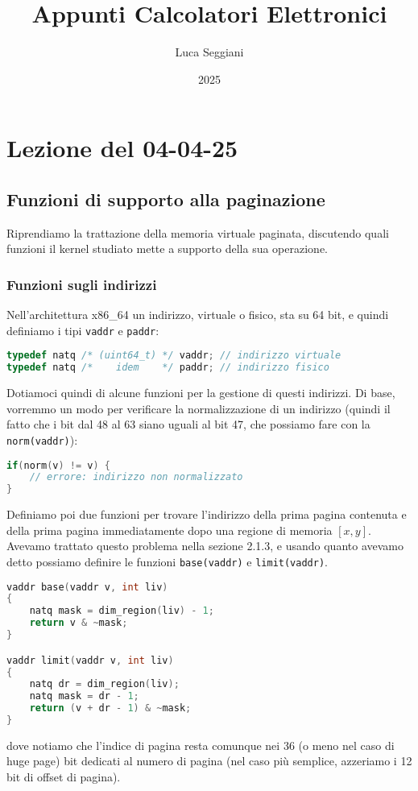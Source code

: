 \documentclass[a4paper,11pt]{article}
\title{Appunti Calcolatori Elettronici}
\author{Luca Seggiani}
\date{2025}
\begin{document}
\section{Lezione del 04-04-25}

\thispagestyle{empty}
\pagestyle{fancy}

\subsection{Funzioni di supporto alla paginazione}
Riprendiamo la trattazione della memoria virtuale paginata, discutendo quali funzioni il kernel studiato mette a supporto della sua operazione.

\subsubsection{Funzioni sugli indirizzi}
Nell'architettura x86\_64 un indirizzo, virtuale o fisico, sta su 64 bit, e quindi definiamo i tipi \lstinline|vaddr| e \lstinline|paddr|:
\begin{lstlisting}[language=C++, style=codestyle]	
typedef natq /* (uint64_t) */ vaddr; // indirizzo virtuale
typedef natq /*    idem    */ paddr; // indirizzo fisico 
\end{lstlisting}

Dotiamoci quindi di alcune funzioni per la gestione di questi indirizzi.
Di base, vorremmo un modo per verificare la normalizzazione di un indirizzo (quindi il fatto che i bit dal 48 al 63 siano uguali al bit 47, che possiamo fare con la \lstinline|norm(vaddr)|):
\begin{lstlisting}[language=C++, style=codestyle]	
if(norm(v) != v) {
	// errore: indirizzo non normalizzato
}
\end{lstlisting}

Definiamo poi due funzioni per trovare l'indirizzo della prima pagina contenuta e della prima pagina immediatamente dopo una regione di memoria $[x, y]$.
Avevamo trattato questo problema nella sezione 2.1.3, e usando quanto avevamo detto possiamo definire le funzioni \lstinline|base(vaddr)| e \lstinline|limit(vaddr)|.
\begin{lstlisting}[language=C++, style=codestyle]	
vaddr base(vaddr v, int liv)
{
	natq mask = dim_region(liv) - 1;
	return v & ~mask;
}

vaddr limit(vaddr v, int liv)
{
	natq dr = dim_region(liv);
	natq mask = dr - 1;
	return (v + dr - 1) & ~mask;
}
\end{lstlisting}
dove notiamo che l'indice di pagina resta comunque nei 36 (o meno nel caso di huge page) bit dedicati al numero di pagina (nel caso più semplice, azzeriamo i 12 bit di offset di pagina). 
\end{document}

